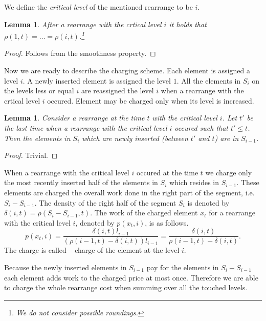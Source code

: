 \documentclass[11pt]{article} %
\newcommand{\density}[2]{\rho(#1, #2)}
\newcommand{\rdensity}[2]{\delta(#1, #2)}
\newtheorem{lemma}[definition]{Lemma}
\begin{document}
We define the \emph{critical level} of the mentioned rearrange to be $i$.

\begin{lemma}
After a rearrange with the crtical level $i$ it holds that $\density{1}{t} = \dots = \density{i}{t}$.\footnote{We do not consider possible roundings.}
\end{lemma}
\begin{proof}
Follows from the smoothness property.
\end{proof}

Now we are ready to describe the charging scheme.
Each element is assigned a level $i$. 
A newly inserted element is assigned the level $1$.
All the elements in $S_i$ on the levels less or equal $i$ are reassigned the level $i$ when a rearrange with the crtical level $i$ occured.
Element may be charged only when its level is increased.

\begin{lemma}
Consider a rearrange at the time $t$ with the critical level $i$.
Let $t'$ be the last time when a rearrange with the critical level $i$ occured such that $t' \leq t$.
Then the elements in $S_i$ which are newly inserted (between $t'$ and $t$) are in $S_{i - 1}$.
\end{lemma}
\begin{proof}
Trivial.
\end{proof}

When a rearrange with the critical level $i$ occured at the time $t$ we charge only the most recently inserted half of the elements in $S_{i}$ which resides in $S_{i - 1}$.
These elements are charged the overall work done in the right part of the segment, i.e. $S_{i} - S_{i - 1}$.
The density of the right half of the segment $S_i$ is denoted by $\rdensity{i}{t} = \density{S_i - S_{i - 1}}{t}$.
The work of the charged element $x_t$ for a rearrange with the critical level $i$, denoted by $p(x_t, i)$, is as follows.
\[
p(x_t, i) = \frac{\rdensity{i}{t} l_{i - 1}}{(\density{i - 1}{t} - \rdensity{i}{t})l_{i - 1}} = \frac{\rdensity{i}{t}}{\density{i - 1}{t} - \rdensity{i}{t}}.
\]
The charge is called -- charge of the element at the level $i$.

Because the newly inserted elements in $S_{i - 1}$ pay for the elements in $S_i - S_{i - 1}$ each element adds work to the charged price at most once.
Therefore we are able to charge the whole rearrange cost when summing over all the touched levels.
\end{document}
